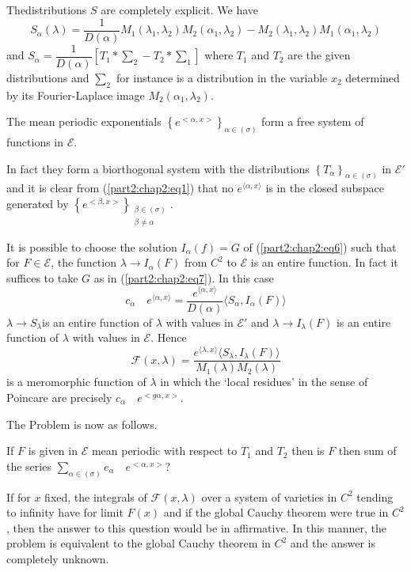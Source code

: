 \begin{remark*}
  The\pageoriginale distributions $S$ are completely explicit. We have
  $$
  S_\alpha (\lambda ) = \frac{1}{D(\alpha )} M_1 (\lambda_1,
  \lambda_2 ) M_2 (\alpha_1,  \lambda_2 ) - M_2 (\lambda_1,  \lambda_2
  ) M_1 (\alpha_1,  \lambda_2) 
  $$
  and $S_\alpha = \dfrac{1}{D(\alpha )} \left[ T_1 * \sum_2 - T_2 *
    \sum_1 \right]$ where $T_1$ and $T_2$ are the given distributions
  and $\sum_2$ for instance is a distribution in the variable $x_2$
  determined by its Fourier-Laplace image $M_2 (\alpha_1,  \lambda_2
  )$. 
\end{remark*}

\begin{theorem*}
  The mean periodic exponentials $\left\{ e^{<\alpha,  x >}
  \right\}_{\alpha \in (\sigma )}$ form a free system of functions in
  $\mathscr{E}$. 
\end{theorem*}

In fact they form a biorthogonal system with the distributions\break 
$\left\{ T_\alpha \right\}_{\alpha \in (\sigma )}$ in $\mathscr{E}'$
and it is clear from (\ref{part2:chap2:eq1}) that no $e^{\langle\alpha, x \rangle}$ is
in the closed subspace generated by $\left\{ e^{<\beta,  x
  >} \right\}_{\substack{\beta \in (\sigma)\\ \beta \neq
    \alpha}}$. 

\begin{remark*}
  It is possible to choose the solution $I_\alpha(f) = G$ of
  (\ref{part2:chap2:eq6})
  such that for $F \in \mathscr{E}$, the function $\lambda \to I_\alpha
  (F)$ from $C^2$ to $\mathscr{E}$ is an entire function. In fact it
  suffices to take $G$ as in (\ref{part2:chap2:eq7}). In this case 
  $$
  c_\alpha \quad e^{\langle\alpha, x \rangle} =
  \frac{e^{\langle\alpha, x \rangle}}{D(\alpha )} \langle S_\alpha,
  I_\alpha (F) \rangle  
  $$
  $\lambda \to S_\lambda$\pageoriginale is an entire function of $\lambda$ with
  values in $\mathscr{E}'$ and $\lambda \to I_\lambda (F)$ is an
  entire function of $\lambda$ with values in $\mathscr{E}$. Hence 
  $$
  \mathscr{F} (x, \lambda ) = \frac{e^{\langle\lambda,  x \rangle}
    \langle S_\lambda,  I_\lambda (F) \rangle}{M_1 (\lambda ) M_2
    (\lambda )} 
  $$
  is a meromorphic function of $\lambda$ in which the `local residues'
  in the sense of Poincare are precisely $c_\alpha \quad e^{< g
    \alpha,  x >}$. 
\end{remark*}

The Problem is now as follows.

If $F$ is given in $\mathscr{E}$ mean periodic with respect to $T_1$
and $T_2$ then is $F$ then sum of the series $\sum\limits_{\alpha \in
  (\sigma )} e_\alpha \quad e^{< \alpha,  x >}$? 

If for $x$ fixed, the integrals of $\mathscr{F}(x, \lambda )$ over a
system of varieties in $C^2$ tending to infinity have for limit $F(x)$
and if the global Cauchy theorem were true in $C^2$, then the answer
to this question would be in affirmative. In this manner, the problem
is equivalent to the global Cauchy theorem in $C^2$ and the answer is
completely unknown. 

